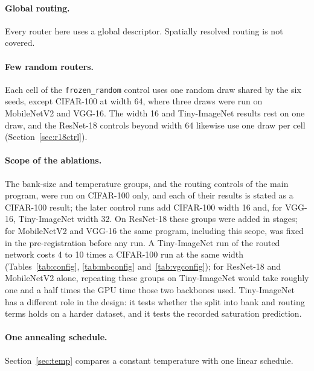 \documentclass[10pt,a4paper]{article}
\begin{document}
\paragraph{Global routing.} Every router here uses a global descriptor.
Spatially resolved routing is not covered.

\paragraph{Few random routers.} Each cell of the \texttt{frozen\_random}
control uses one random draw shared by the six seeds, except
CIFAR-100 at width 64, where three draws were run on MobileNetV2 and
VGG-16. The width 16 and Tiny-ImageNet results rest on one draw, and the ResNet-18
controls beyond width 64 likewise use one draw per cell (Section~\ref{sec:r18ctrl}).

\paragraph{Scope of the ablations.} The bank-size and temperature groups, and the
routing controls of the main program, were run on CIFAR-100 only, and each
of their results is stated as a CIFAR-100 result; the later control runs
add CIFAR-100 width 16 and, for VGG-16, Tiny-ImageNet width 32. On ResNet-18 these groups were
added in stages; for MobileNetV2 and VGG-16 the same program, including
this scope, was fixed in the pre-registration before any run. A
Tiny-ImageNet run of the routed network costs 4 to 10 times a CIFAR-100
run at the same width (Tables~\ref{tab:config}, \ref{tab:mbconfig}
and~\ref{tab:vgconfig}); for ResNet-18 and MobileNetV2 alone, repeating
these groups on Tiny-ImageNet would take roughly one and a half times the
GPU time those two backbones used. Tiny-ImageNet has a different role in
the design: it tests whether the split into bank and routing terms holds
on a harder dataset, and it tests the recorded saturation prediction.

\paragraph{One annealing schedule.} Section~\ref{sec:temp} compares a
constant temperature with one linear schedule.
\end{document}
